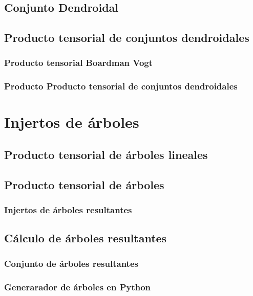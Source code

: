 \documentclass[11pt,a4paper,openright,oneside]{article}
\numberwithin{equation}{section}
\theoremstyle{definition}
\begin{document}
\subsection{Conjunto Dendroidal}
\subsection{Producto tensorial de conjuntos dendroidales}
\subsubsection{Producto tensorial Boardman Vogt}
\subsubsection{Producto Producto tensorial de conjuntos dendroidales}
\newpage


\section{Injertos de \'arboles}
\subsection{Producto tensorial de \'arboles lineales}
\subsection{Producto tensorial de \'arboles}
\subsubsection{Injertos de \'arboles resultantes}
\subsection{C\'alculo de \'arboles resultantes}
\subsubsection{Conjunto de \'arboles resultantes}
\subsubsection{Generarador de \'arboles en Python}
\newpage
\end{document}
